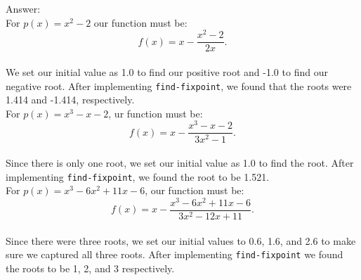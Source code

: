 \documentclass[12pt,letterpaper]{ntdhw}
\begin{document}
\begin{enumerate}
\begin{enumerate}
    \begin{emph}
      Answer: %
      \\For \( p(x) = x^2 - 2 \) our function must be: \[
    f(x) = x - \frac{x^2-2}{2x}.
    \]
    \\ We set our initial value as 1.0 to find our positive root and -1.0 to find our negative root. After implementing {\tt find-fixpoint}, we found that the roots were 1.414 and -1.414, respectively.
    \\For \( p(x) = x^3 - x - 2 \), ur function must be: \[
    f(x) = x - \frac{x^3 - x - 2}{3x^2 - 1}.
    \]
  \\ Since there is only one root, we set our initial value as 1.0 to find the root. After implementing {\tt find-fixpoint}, we found the root to be 1.521.
  \\For \( p(x) = x^3 - 6x^2 + 11x - 6 \), our function must be: \[
    f(x) = x - \frac{x^3 - 6x^2 + 11x -6}{3x^2-12x+11}.
    \]
  \\ Since there were three roots, we set our initial values to 0.6, 1.6, and 2.6 to make sure we captured all three roots. After implementing {\tt find-fixpoint} we found the roots to be 1, 2, and 3 respectively.
  \end{emph}

  \end{enumerate}

\end{enumerate}
\end{document}
